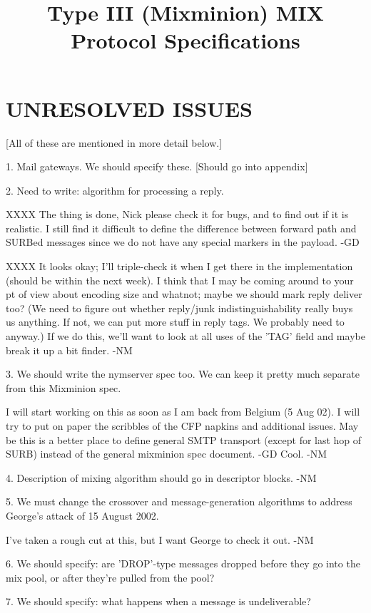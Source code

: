 \title{Type III (Mixminion) MIX Protocol Specifications}

\section{UNRESOLVED ISSUES}

[All of these are mentioned in more detail below.]

1. Mail gateways. We should specify these.
   [Should go into appendix]
     
2. Need to write: algorithm for processing a reply.

   XXXX The thing is done, Nick please check it for bugs, and to find
   out if it is realistic. I still find it difficult to define the
   difference between forward path and SURBed messages since we do not
   have any special markers in the payload. -GD

   XXXX It looks okay; I'll triple-check it when I get there in the
   implementation (should be within the next week).  I think that I
   may be coming around to your pt of view about encoding size and
   whatnot; maybe we should mark reply deliver too?  (We need to
   figure out whether reply/junk indistinguishability really buys
   us anything.  If not, we can put more stuff in reply tags.  We
   probably need to anyway.)  If we do this, we'll want to look at all
   uses of the 'TAG' field and maybe break it up a bit finder.  -NM

3. We should write the nymserver spec too. We can keep it pretty much
    separate from this Mixminion spec.

    I will start working on this as soon as I am back from Belgium (5
    Aug 02). I will try to put on paper the scribbles of the CFP
    napkins and additional issues. May be this is a better place to
    define general SMTP transport (except for last hop of SURB)
    instead of the general mixminion spec document. -GD
    Cool. -NM    

4. Description of mixing algorithm should go in descriptor blocks. -NM

5. We must change the crossover and message-generation algorithms to address
   George's attack of 15 August 2002.

   I've taken a rough cut at this, but I want George to check it out. -NM

6. We should specify: are 'DROP'-type messages dropped before they go
    into the mix pool, or after they're pulled from the pool?

7. We should specify: what happens when a message is undeliverable?

